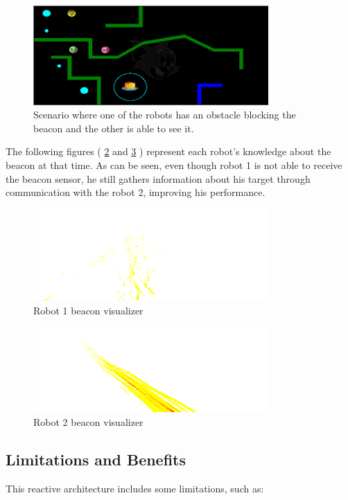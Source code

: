 \documentclass[oribibl]{llncs}
\begin{document}
\begin{figure}
  \centering
  \includegraphics[width=0.8\textwidth]{viewer.png}
  \caption{Scenario where one of the robots has an obstacle blocking the beacon and the other is able to see it.}
  \label{fig:viewer}
\end{figure}

The following figures ( \ref{fig:visualizer1} and \ref{fig:visualizer2} ) represent each robot's knowledge about the beacon at that time. As can be seen, even though robot 1 is not able to receive the beacon sensor, he still gathers information about his target through communication with the robot 2, improving his performance.

\begin{figure}
  \centering
  \includegraphics[width=0.8\textwidth]{visualizer1.png}
  \caption{Robot 1 beacon visualizer}
  \label{fig:visualizer1}
\end{figure}

\begin{figure}
  \centering
  \includegraphics[width=0.8\textwidth]{visualizer2.png}
  \caption{Robot 2 beacon visualizer}
  \label{fig:visualizer2}
\end{figure}


\subsection{Limitations and Benefits}
This reactive architecture includes some limitations, such as:
\end{document}
